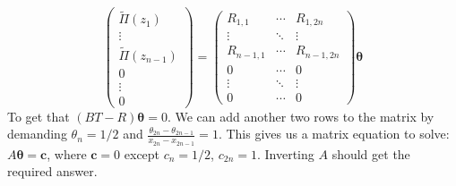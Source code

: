 \documentclass{article}
\newcommand{\bs}{\boldsymbol}                               %
\begin{document}
\[ \left( \begin{array}{c} \tilde{\Pi}(z_1) \\ \vdots \\ \tilde{\Pi}(z_{n-1}) 
\\[4pt] 0 \\ \vdots \\ 0 \end{array} \right) =
\left( \begin{array}{ccc} R_{1,1} & \cdots & R_{1 , 2n} \\
\vdots & \ddots & \vdots \\ R_{n-1,1} & \cdots & R_{n-1 , 2n} 
\\ 0 & \cdots & 0  \\
\vdots & \ddots & \vdots \\ 0 & \cdots & 0 
\end{array} \right) \bs{\theta} \]
To get that $(BT-R)\bs{\theta} = 0$. We can add another two rows to the
matrix by demanding $\theta_n=1/2$ and 
$\displaystyle \frac{\theta_{2n}-\theta_{2n-1}}{x_{2n}- x_{2n-1}}=1$.
This gives us a matrix equation to solve: $A \bs{\theta} = \bs{c}$, where
$\bs{c}=0$ except $c_n=1/2$, $c_{2n}=1$. Inverting $A$ should get the 
required answer.
\end{document}

